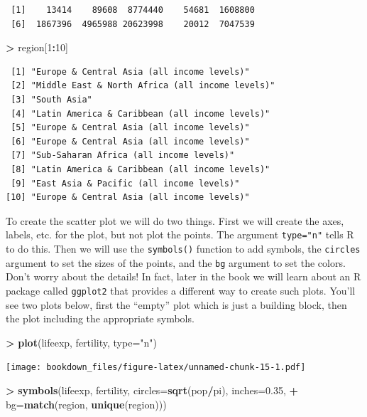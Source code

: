 \documentclass[]{krantz}
\makeatletter
\newenvironment{Shaded}{\begin{snugshade}}{\end{snugshade}}
\newcommand{\KeywordTok}[1]{\textcolor[rgb]{0.27,0.27,0.27}{\textbf{#1}}}
\newcommand{\DataTypeTok}[1]{\textcolor[rgb]{0.27,0.27,0.27}{#1}}
\newcommand{\DecValTok}[1]{\textcolor[rgb]{0.06,0.06,0.06}{#1}}
\newcommand{\FloatTok}[1]{\textcolor[rgb]{0.06,0.06,0.06}{#1}}
\newcommand{\StringTok}[1]{\textcolor[rgb]{0.5,0.5,0.5}{#1}}
\newcommand{\OperatorTok}[1]{\textcolor[rgb]{0.43,0.43,0.43}{\textbf{#1}}}
\newcommand{\NormalTok}[1]{#1}
\newenvironment{kframe}{%
\medskip{}
\setlength{\fboxsep}{.8em}
 \def\at@end@of@kframe{}%
 \ifinner\ifhmode%
  \def\at@end@of@kframe{\end{minipage}}%
  \begin{minipage}{\columnwidth}%
 \fi\fi%
 \def\FrameCommand##1{\hskip\@totalleftmargin \hskip-\fboxsep
 \colorbox{shadecolor}{##1}\hskip-\fboxsep
     \hskip-\linewidth \hskip-\@totalleftmargin \hskip\columnwidth}%
 \MakeFramed {\advance\hsize-\width
   \@totalleftmargin\z@ \linewidth\hsize
   \@setminipage}}%
 {\par\unskip\endMakeFramed%
 \at@end@of@kframe}
\renewenvironment{Shaded}{\begin{kframe}}{\end{kframe}}
\makeatother
\begin{document}
\begin{verbatim}
 [1]    13414    89608  8774440    54681  1608800
 [6]  1867396  4965988 20623998    20012  7047539
\end{verbatim}

\begin{Shaded}
\begin{Highlighting}[]
\OperatorTok{>}\StringTok{ }\NormalTok{region[}\DecValTok{1}\OperatorTok{:}\DecValTok{10}\NormalTok{]}
\end{Highlighting}
\end{Shaded}

\begin{verbatim}
 [1] "Europe & Central Asia (all income levels)"     
 [2] "Middle East & North Africa (all income levels)"
 [3] "South Asia"                                    
 [4] "Latin America & Caribbean (all income levels)" 
 [5] "Europe & Central Asia (all income levels)"     
 [6] "Europe & Central Asia (all income levels)"     
 [7] "Sub-Saharan Africa (all income levels)"        
 [8] "Latin America & Caribbean (all income levels)" 
 [9] "East Asia & Pacific (all income levels)"       
[10] "Europe & Central Asia (all income levels)"     
\end{verbatim}

To create the scatter plot we will do two things. First we will create
the axes, labels, etc. for the plot, but not plot the points. The
argument \texttt{type="n"} tells R to do this. Then we will use the
\texttt{symbols()} function to add symbols, the \texttt{circles}
argument to set the sizes of the points, and the \texttt{bg} argument to
set the colors. Don't worry about the details! In fact, later in the
book we will learn about an R package called \texttt{ggplot2} that
provides a different way to create such plots. You'll see two plots
below, first the ``empty'' plot which is just a building block, then the
plot including the appropriate symbols.

\begin{Shaded}
\begin{Highlighting}[]
\OperatorTok{>}\StringTok{ }\KeywordTok{plot}\NormalTok{(lifeexp, fertility, }\DataTypeTok{type=}\StringTok{"n"}\NormalTok{)}
\end{Highlighting}
\end{Shaded}

\texttt{[image: bookdown\_files/figure-latex/unnamed-chunk-15-1.pdf]}

\begin{Shaded}
\begin{Highlighting}[]
\OperatorTok{>}\StringTok{ }\KeywordTok{symbols}\NormalTok{(lifeexp, fertility, }\DataTypeTok{circles=}\KeywordTok{sqrt}\NormalTok{(pop}\OperatorTok{/}\NormalTok{pi), }\DataTypeTok{inches=}\FloatTok{0.35}\NormalTok{, }
\OperatorTok{+}\StringTok{         }\DataTypeTok{bg=}\KeywordTok{match}\NormalTok{(region, }\KeywordTok{unique}\NormalTok{(region)))}
\end{Highlighting}
\end{Shaded}
\end{document}

